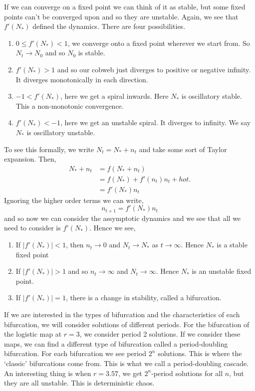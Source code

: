 If we can converge on a fixed point we can think of it as stable, but some fixed points can't be converged upon and so they are unstable. Again, we see that $f'(N_*)$ defined the dynamics. There are four possibilities.
\begin{enumerate}
  \item $0 \le f'(N_*) < 1$, we converge onto a fixed point wherever we start from. So $N_t \to N_0$ and so $N_0$ is stable.
  \item $f'(N_*) > 1$ and so our cobweb just diverges to positive or negative infinity. It diverges monotonically in each direction.
  \item $-1 < f'(N_*)$, here we get a spiral inwards. Here $N_*$ is oscillatory stable. This a non-monotonic convergence.
  \item $f'(N_*) < -1$, here we get an unstable spiral. It diverges to infinity. We say $N_*$ is oscillatory unstable.
\end{enumerate}
To see this formally, we write $N_t = N_* + n_t$ and take some sort of Taylor expansion. Then,
\begin{align*}
  N_* + n_t &= f(N_* + n_t) \\
  &= f(N_*) + f'(n_t)n_t + hot.\\
  &= f'(N_*)n_t
\end{align*}
Ignoring the higher order terms we can write,
$$ n_{t+1} = f'(N_*)n_t $$
and so now we can consider the assymptotic dynamics and we see that all we need to consider is $f'(N_*)$. Hence we see,
\begin{enumerate}
  \item If $|f'(N_*)| < 1$, then $n_t \to 0$ and $N_t \to N_*$ as $t \to \infty$. Hence $N_*$ is a stable fixed point
  \item If $|f'(N_*)| > 1$ and so $n_t \to \infty$ and $N_t \to \infty$. Hence $N_*$ is an unstable fixed point.
  \item If $|f'(N_*)| = 1$, there is a change in stability, called a bifurcation.
\end{enumerate}

If we are interested in the types of bifurcation and the characteristics of each bifurcation, we will consider solutions of different periods. For the bifurcation of the logistic map at $r=3$, we consider period 2 solutions. If we consider these maps, we can find a different type of bifurcation called a period-doubling bifurcation. For each bifurcation we see period $2^n$ solutions. This is where the `classic' bifurcations come from. This is what we call a period-doubling cascade. An interesting thing is when $r = 3.57$, we get $2^n$-period solutions for all $n$, but they are all unstable. This is deterministic chaos.

